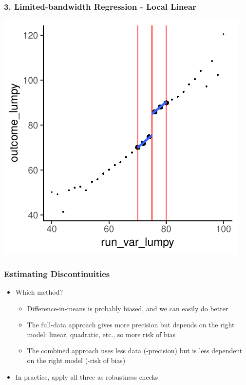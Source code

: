 \documentclass[xcolor=x11names,compress]{beamer}\usepackage[]{graphicx}\usepackage[]{color}
\makeatletter
\def\maxwidth{ %
  \ifdim\Gin@nat@width>\linewidth
    \linewidth
  \else
    \Gin@nat@width
  \fi
}
\newenvironment{knitrout}{}{} %
\renewcommand{\(}{\begin{columns}}
\renewcommand{\)}{\end{columns}}
\newcommand{\<}[1]{\begin{column}{#1}}
\renewcommand{\>}{\end{column}}
\makeatother
\begin{document}
\begin{frame}
\frametitle{3. Limited-bandwidth Regression - Local Linear}
\begin{center}
\begin{knitrout}
\color{fgcolor}
\includegraphics[width=\maxwidth]{figure/chart6-1} 

\end{knitrout}
\end{center}
\end{frame}

\begin{frame}
\frametitle{Estimating Discontinuities}
\begin{itemize}
\item Which method?
\pause
\begin{itemize}
\item Difference-in-means is probably biased, and we can easily do better
\pause
\item The full-data approach gives more precision but depends on the right model: linear, quadratic, etc., so more risk of bias
\pause
\item The combined approach uses less data (-precision) but is less dependent on the right model (-risk of bias)
\pause
\end{itemize}
\item In practice, apply all three as robustness checks
\end{itemize}
\end{frame}
\end{document}
